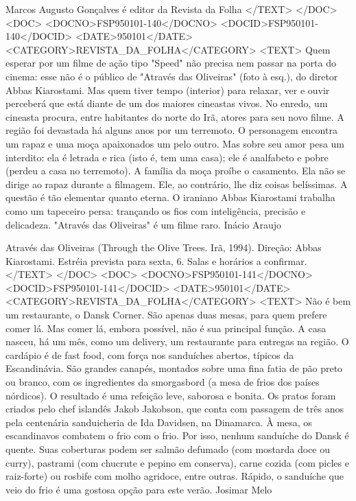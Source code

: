 Marcos Augusto Gonçalves é editor da Revista da Folha
</TEXT>
</DOC>
<DOC>
<DOCNO>FSP950101-140</DOCNO>
<DOCID>FSP950101-140</DOCID>
<DATE>950101</DATE>
<CATEGORY>REVISTA_DA_FOLHA</CATEGORY>
<TEXT>
Quem esperar por um filme de ação tipo "Speed" não precisa nem passar na porta do cinema: esse não é o público de "Através das Oliveiras" (foto à esq.), do diretor Abbas Kiarostami. Mas quem tiver tempo (interior) para relaxar, ver e ouvir perceberá que está diante de um dos maiores cineastas vivos.
No enredo, um cineasta procura, entre habitantes do norte do Irã, atores para seu novo filme. A região foi devastada há alguns anos por um terremoto. O personagem encontra um rapaz e uma moça apaixonados um pelo outro.
Mas sobre seu amor pesa um interdito: ela é letrada e rica (isto é, tem uma casa); ele é analfabeto e pobre (perdeu a casa no terremoto). A família da moça proíbe o casamento. Ela não se dirige ao rapaz durante a filmagem. Ele, ao contrário, lhe diz coisas belíssimas.
A questão é tão elementar quanto eterna. O iraniano Abbas Kiarostami trabalha como um tapeceiro persa: trançando os fios com inteligência, precisão e delicadeza. "Através das Oliveiras" é um filme raro.
Inácio Araujo 

Através das Oliveiras (Through the Olive Trees. Irã, 1994). Direção: Abbas Kiarostami. Estréia prevista para sexta, 6. Salas e horários a confirmar.
</TEXT>
</DOC>
<DOC>
<DOCNO>FSP950101-141</DOCNO>
<DOCID>FSP950101-141</DOCID>
<DATE>950101</DATE>
<CATEGORY>REVISTA_DA_FOLHA</CATEGORY>
<TEXT>
Não é bem um restaurante, o Dansk Corner. São apenas duas mesas, para quem prefere comer lá. Mas comer lá, embora possível, não é sua principal função. A casa nasceu, há um mês, como um delivery, um restaurante para entregas na região.
O cardápio é de fast food, com força nos sanduíches abertos, típicos da Escandinávia. São grandes canapés, montados sobre uma fina fatia de pão preto ou branco, com os ingredientes da smorgasbord (a mesa de frios dos países nórdicos).
O resultado é uma refeição leve, saborosa e bonita. Os pratos foram criados pelo chef islandês Jakob Jakobson, que conta com passagem de três anos pela centenária sanduicheria de Ida Davidsen, na Dinamarca.
À mesa, os escandinavos combatem o frio com o frio. Por isso, nenhum sanduíche do Dansk é quente. Suas coberturas podem ser salmão defumado (com mostarda doce ou curry), pastrami (com chucrute e pepino em conserva), carne cozida (com picles e raiz-forte) ou rosbife com molho agridoce, entre outras.
Rápido, o sanduíche que veio do frio é uma gostosa opção para este verão. Josimar Melo

